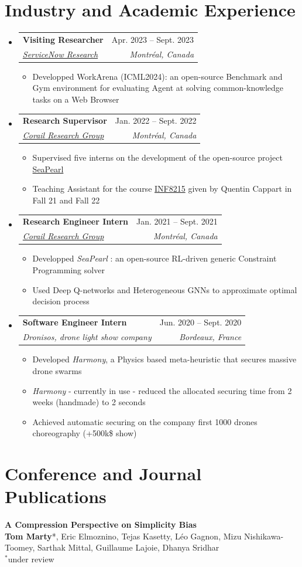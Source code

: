 \documentclass[letterpaper,11pt]{article}
\makeatletter
\newcommand{\resumeItem}[1]{
  \item\small{
    {#1 \vspace{-2pt}}
  }
}
\newcommand{\resumeSubheading}[4]{
  \vspace{-2pt}\item
    \begin{tabular*}{0.97\textwidth}[t]{l@{\extracolsep{\fill}}r}
      \textbf{#1} & #2 \\
      \textit{\small#3} & \textit{\small #4} \\
    \end{tabular*}\vspace{-7pt}
}
\newcommand{\resumeSubHeadingListStart}{\begin{itemize}[leftmargin=0.15in, label={}]}
\newcommand{\resumeSubHeadingListEnd}{\end{itemize}}
\newcommand{\resumeItemListStart}{\begin{itemize}}
\newcommand{\resumeItemListEnd}{\end{itemize}\vspace{-5pt}}
\makeatother
\begin{document}
\section{Industry and Academic Experience}
  \resumeSubHeadingListStart
      \resumeSubheading
      {Visiting Researcher}{Apr. 2023 -- Sept. 2023}
      {\href{https://corail-research.github.io/}{ServiceNow Research}}{Montréal, Canada}
    \resumeItemListStart
        \resumeItem{Developped WorkArena (ICML2024): an open-source Benchmark and Gym environment for evaluating Agent at solving common-knowledge tasks on a Web Browser}
      \resumeItemListEnd
      \resumeSubheading
      {Research Supervisor}{Jan. 2022 -- Sept. 2022}
      {\href{https://corail-research.github.io/}{Corail Research Group}}{Montréal, Canada}
    \resumeItemListStart
        \resumeItem{Supervised five interns on the development of the open-source project \href{https://github.com/corail-research/SeaPearl.jl}{SeaPearl}}
        \resumeItem{Teaching Assistant for the course \href{https://www.polymtl.ca/programmes/cours/intelligence-artif-methodes-et-algorithmes}{INF8215} given by Quentin Cappart in Fall 21 and Fall 22 }
      \resumeItemListEnd
    \resumeSubheading
      {Research Engineer Intern}{Jan. 2021 -- Sept. 2021}
      {\href{https://corail-research.github.io/}{Corail Research Group}}{Montréal, Canada}
    \resumeItemListStart
        \resumeItem{Developped {\textit{SeaPearl}} : an open-source RL-driven generic Constraint Programming solver}
        \resumeItem{Used Deep Q-networks and Heterogeneous GNNs to approximate optimal decision process}
    \resumeItemListEnd
    \resumeSubheading
      {Software Engineer Intern}{Jun. 2020 -- Sept. 2020}
      {Dronisos, drone light show company}{Bordeaux, France}
      \resumeItemListStart
        \resumeItem{Developed \textit{Harmony}, a Physics based meta-heuristic that secures massive drone swarms }
                \resumeItem{\textit{Harmony} - currently in use - reduced the allocated securing time from 2 weeks (handmade) to 2 seconds}
        \resumeItem{Achieved automatic securing on the company first 1000 drones choreography (+500k\$ show)}
      \resumeItemListEnd
    
  \resumeSubHeadingListEnd


\section{Conference and Journal Publications}
\begin{tcolorbox}[enhanced, rounded corners, colback=white, colframe=black!10!white, boxrule=0.5mm, left=10pt, right=10pt, top=6pt, bottom=3pt]
    \textbf{A Compression Perspective on Simplicity Bias} \\
    \textbf{Tom Marty}*, Eric Elmoznino, Tejas Kasetty, Léo Gagnon, Mizu Nishikawa-Toomey, Sarthak Mittal, Guillaume Lajoie, Dhanya Sridhar \\
    $^*$under review
\end{tcolorbox}
\end{document}
